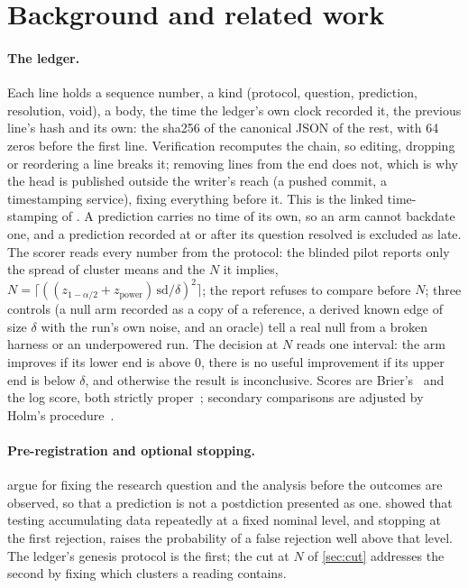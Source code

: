 \documentclass[11pt]{article}
\theoremstyle{plain}
\theoremstyle{definition}
\theoremstyle{remark}
\begin{document}
\section{Background and related work}

\paragraph{The ledger.} Each line holds a sequence number, a kind (protocol, question,
prediction, resolution, void), a body, the time the ledger's own clock recorded it, the previous
line's hash and its own: the sha256 of the canonical JSON of the rest, with 64 zeros before the
first line. Verification recomputes the chain, so editing, dropping or reordering a line breaks it;
removing lines from the end does not, which is why the head is published outside the writer's
reach (a pushed commit, a timestamping service), fixing everything before it. This is the linked time-stamping of \citet{haber1991}. A prediction
carries no time of its own, so an arm cannot backdate one, and a prediction recorded at or after
its question resolved is excluded as late. The scorer reads every number from the protocol: the
blinded pilot reports only the spread of cluster means and the $N$ it implies,
$N = \lceil ((z_{1-\alpha/2} + z_{\text{power}})\, \mathrm{sd} / \delta)^2 \rceil$; the report
refuses to compare before $N$; three controls (a null arm recorded as a copy of a reference, a
derived known edge of size $\delta$ with the run's own noise, and an oracle) tell a real null from
a broken harness or an underpowered run. The decision at $N$ reads one interval: the arm improves
if its lower end is above 0, there is no useful improvement if its upper end is below $\delta$, and
otherwise the result is inconclusive. Scores are Brier's~\cite{brier1950} and the log score, both
strictly proper~\cite{gneiting2007}; secondary comparisons are adjusted by Holm's
procedure~\cite{holm1979}.

\paragraph{Pre-registration and optional stopping.} \citet{nosek2018} argue for fixing the
research question and the analysis before the outcomes are observed, so that a prediction is not a
postdiction presented as one. \citet{armitage1969} showed that testing accumulating data
repeatedly at a fixed nominal level, and stopping at the first rejection, raises the probability of
a false rejection well above that level. The ledger's genesis protocol is the first; the cut at $N$
of \cref{sec:cut} addresses the second by fixing which clusters a reading contains.
\end{document}
